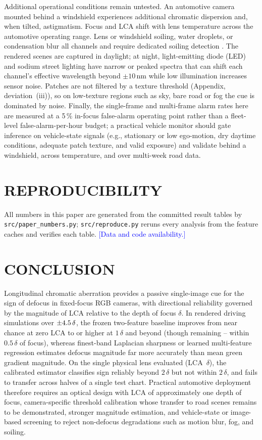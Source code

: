 \documentclass{ieee-ojvt}
\newcommand{\note}[1]{\textcolor{blue}{[#1]}}
\begin{document}
Additional operational conditions remain untested. An automotive camera mounted behind a windshield experiences additional chromatic dispersion and, when tilted, astigmatism. Focus and LCA shift with lens temperature across the automotive operating range. Lens or windshield soiling, water droplets, or condensation blur all channels and require dedicated soiling detection \cite{uricar2019soilingnet}. The rendered scenes are captured in daylight; at night, light-emitting diode (LED) and sodium street lighting have narrow or peaked spectra that can shift each channel's effective wavelength beyond $\pm10$\,nm while low illumination increases sensor noise. Patches are not filtered by a texture threshold (Appendix, deviation~(iii)), so on low-texture regions such as sky, bare road or fog the cue is dominated by noise. Finally, the single-frame and multi-frame alarm rates here are measured at a 5\,\% in-focus false-alarm operating point rather than a fleet-level false-alarm-per-hour budget; a practical vehicle monitor should gate inference on vehicle-state signals (e.g., stationary or low ego-motion, dry daytime conditions, adequate patch texture, and valid exposure) and validate behind a windshield, across temperature, and over multi-week road data.

\section{REPRODUCIBILITY}
All numbers in this paper are generated from the committed result tables by \texttt{src/paper\_numbers.py}; \texttt{src/reproduce.py} reruns every analysis from the feature caches and verifies each table. \note{Data and code availability.}

\section{CONCLUSION}
Longitudinal chromatic aberration provides a passive single-image cue for the sign of defocus in fixed-focus RGB cameras, with directional reliability governed by the magnitude of LCA relative to the depth of focus $\delta$. In rendered driving simulations over $\pm4.5\,\delta$, the frozen two-feature baseline improves from near chance at zero LCA to \MthreeLvlTopDir{} or higher at $1\,\delta$ and beyond (though remaining \MthreeLvlOneNearMin--\MthreeLvlOneNearMax{} within $0.5\,\delta$ of focus), whereas finest-band Laplacian sharpness or learned multi-feature regression estimates defocus magnitude far more accurately than mean green gradient magnitude. On the single physical lens evaluated (LCA \LabLcaDelta\,$\delta$), the calibrated estimator classifies sign reliably beyond $2\,\delta$ but not within $2\,\delta$, and fails to transfer across halves of a single test chart. Practical automotive deployment therefore requires an optical design with LCA of approximately one depth of focus, camera-specific threshold calibration whose transfer to road scenes remains to be demonstrated, stronger magnitude estimation, and vehicle-state or image-based screening to reject non-defocus degradations such as motion blur, fog, and soiling.
\end{document}
